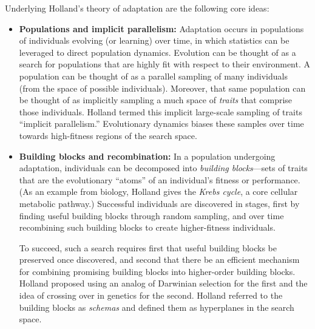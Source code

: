 \documentclass{sig-alternate}
\begin{document}
Underlying Holland's theory of adaptation are the following core ideas: 

\begin{itemize}
\item{\bf Populations and implicit parallelism:} Adaptation occurs in
  populations of individuals evolving (or learning) over time, in
  which statistics can be leveraged to direct population dynamics.
  Evolution can be thought of as a search for populations that are highly fit with respect to their environment.  
  A population can be thought of as a parallel sampling of many
  individuals (from the space of possible individuals).  Moreover,
  that same population can be thought of as implicitly sampling a much
  space of \emph{traits} that comprise those individuals.
  Holland termed this implicit large-scale sampling of traits ``implicit
  parallelism.''    Evolutionary dynamics biases these samples over time towards
  high-fitness regions of the search space.


\item{\bf Building blocks and recombination:} 
  In a population undergoing adaptation,
  individuals can be decomposed into \emph{building blocks}---sets of
  traits that are the evolutionary ``atoms'' of an individual's
  fitness or performance. (As an example from biology, Holland gives
  the \emph{Krebs cycle}, a core cellular metabolic
  pathway.)   Successful individuals
  are discovered in stages, first by finding useful
  building blocks through random sampling, and over
  time recombining such building blocks to create higher-fitness individuals. 



  To succeed, such a search requires first that
  useful building blocks be preserved once discovered, and second that
  there be an efficient mechanism for combining promising building
  blocks into higher-order building blocks.  Holland proposed using an
  analog of Darwinian selection for the first and the idea of crossing
  over in genetics for the second.  Holland referred to the building
  blocks as \emph{schemas} and defined them as hyperplanes in the search space. 


\end{itemize}
\end{document}
